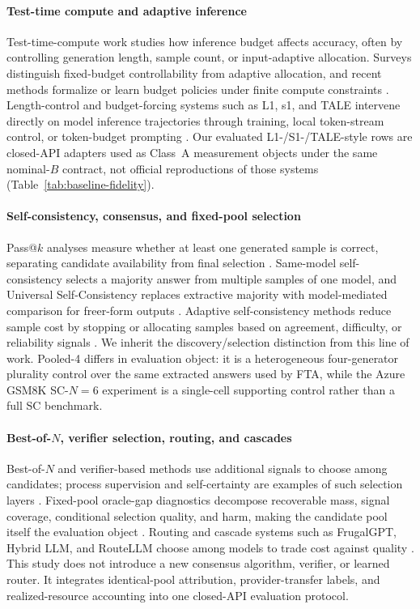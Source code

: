 \paragraph{Test-time compute and adaptive inference}
Test-time-compute work studies how inference budget affects accuracy, often by controlling
generation length, sample count, or input-adaptive allocation. Surveys distinguish fixed-budget
controllability from adaptive allocation, and recent methods formalize or learn budget policies
under finite compute constraints \citep{ttc_budget_survey,snell_ttc,adaptive_ttc_cpo,adactrl}.
Length-control and budget-forcing systems such as L1, s1, and TALE intervene directly on model
inference trajectories through training, local token-stream control, or token-budget prompting
\citep{l1,s1,tale}. Our evaluated L1-/S1-/TALE-style rows are closed-API adapters used as Class~A
measurement objects under the same nominal-$B$ contract, not official reproductions of those
systems (Table~\ref{tab:baseline-fidelity}).

\paragraph{Self-consistency, consensus, and fixed-pool selection}
Pass@$k$ analyses measure whether at least one generated sample is correct, separating candidate
availability from final selection \citep{passatk,ll_monkeys}. Same-model self-consistency selects a
majority answer from multiple samples of one model, and Universal Self-Consistency replaces
extractive majority with model-mediated comparison for freer-form outputs
\citep{selfconsistency,universal_sc}. Adaptive self-consistency methods reduce sample cost by
stopping or allocating samples based on agreement, difficulty, or reliability signals
\citep{adaptive_consistency,esc,difficulty_adaptive_sc,reasc}. We inherit the discovery/selection
distinction from this line of work. Pooled-4 differs in evaluation object: it is a heterogeneous
four-generator plurality control over the same extracted answers used by FTA, while the Azure
GSM8K SC-$N{=}6$ experiment is a single-cell supporting control rather than a full SC benchmark.

\paragraph{Best-of-\texorpdfstring{$N$}{N}, verifier selection, routing, and cascades}
Best-of-$N$ and verifier-based methods use additional signals to choose among candidates; process
supervision and self-certainty are examples of such selection layers \citep{letsverify,self_certainty}.
Fixed-pool oracle-gap diagnostics decompose recoverable mass, signal coverage, conditional selection
quality, and harm, making the candidate pool itself the evaluation object \citep{oracle_gap}.
Routing and cascade systems such as FrugalGPT, Hybrid LLM, and RouteLLM choose among models to trade
cost against quality \citep{frugalgpt,hybrid_llm,routellm}. This study does not introduce a new
consensus algorithm, verifier, or learned router. It integrates identical-pool attribution,
provider-transfer labels, and realized-resource accounting into one closed-API evaluation protocol.


